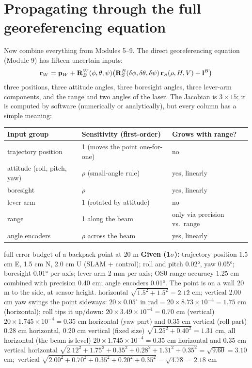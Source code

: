 \section{Propagating through the full georeferencing equation}\label{sec:fullbudget}
Now combine everything from Modules 5--9. The direct georeferencing equation (Module 9) has fifteen uncertain inputs:
\[ \mathbf{r}_W=\mathbf{p}_W+\mathbf{R}^W_B(\phi,\theta,\psi)\big(\mathbf{R}^B_S(\delta\phi,\delta\theta,\delta\psi)\,\mathbf{r}_S(\rho,H,V)+\mathbf{l}^B\big) \]
three positions, three attitude angles, three boresight angles, three lever-arm components, and the range and two angles of the laser. The Jacobian is $3\times15$; it is computed by software (numerically or analytically), but every column has a simple meaning:

\begin{center}\small
\renewcommand{\arraystretch}{1.25}
\begin{tabularx}{\linewidth}{lXl}\toprule
\textbf{Input group} & \textbf{Sensitivity (first-order)} & \textbf{Grows with range?}\\\midrule
trajectory position & 1 (moves the point one-for-one) & no\\
attitude (roll, pitch, yaw) & $\rho$ (small-angle rule) & yes, linearly\\
boresight & $\rho$ & yes, linearly\\
lever arm & 1 (rotated by attitude) & no\\
range & 1 along the beam & only via precision vs.\ range\\
angle encoders & $\rho$ across the beam & yes, linearly\\\bottomrule
\end{tabularx}\end{center}

\begin{worked}{full error budget of a backpack point at 20 m}
\textbf{Given (1$\sigma$):} trajectory position 1.5 cm E, 1.5 cm N, 2.0 cm U (SLAM + control); roll and pitch 0.02°, yaw 0.05°; boresight 0.01° per axis; lever arm 2 mm per axis; OS0 range accuracy 1.25 cm combined with precision 0.40 cm; angle encoders 0.01°. The point is on a wall 20 m to the side, at sensor height.
 horizontal $\sqrt{1.5^2+1.5^2}=2.12$ cm; vertical 2.00 cm
 yaw swings the point sideways: $20\times0.05^\circ\text{ in rad}=20\times8.73\times10^{-4}=1.75$ cm (horizontal); roll tips it up/down: $20\times3.49\times10^{-4}=0.70$ cm (vertical)
 $20\times1.745\times10^{-4}=0.35$ cm horizontal (yaw part) and 0.35 cm vertical (roll part)
 0.28 cm horizontal, 0.20 cm vertical (fixed size)
 $\sqrt{1.25^2+0.40^2}=1.31$ cm, all horizontal (the beam is level)
 $20\times1.745\times10^{-4}=0.35$ cm horizontal and 0.35 cm vertical
 horizontal $\sqrt{2.12^2+1.75^2+0.35^2+0.28^2+1.31^2+0.35^2}=\sqrt{9.60}=3.10$ cm;\ vertical $\sqrt{2.00^2+0.70^2+0.35^2+0.20^2+0.35^2}=\sqrt{4.78}=2.18$ cm
\end{worked}

